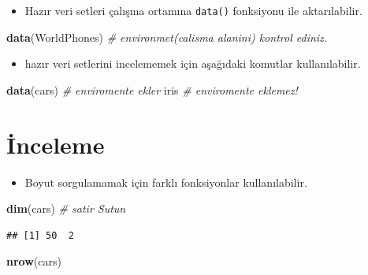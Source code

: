 \documentclass[
  oneside]{book}
\newenvironment{Shaded}{\begin{snugshade}}{\end{snugshade}}
\newcommand{\CommentTok}[1]{\textcolor[rgb]{0.56,0.35,0.01}{\textit{#1}}}
\newcommand{\FunctionTok}[1]{\textcolor[rgb]{0.13,0.29,0.53}{\textbf{#1}}}
\newcommand{\NormalTok}[1]{#1}
\providecommand{\tightlist}{%
  \setlength{\itemsep}{0pt}\setlength{\parskip}{0pt}}
\begin{document}
\begin{itemize}
\tightlist
\item
  Hazır veri setleri çalışma ortamına \texttt{data()} fonksiyonu ile aktarılabilir.
\end{itemize}

\begin{Shaded}
\begin{Highlighting}[]
\FunctionTok{data}\NormalTok{(WorldPhones) }\CommentTok{\# environmet(calisma alanini) kontrol ediniz. }
\end{Highlighting}
\end{Shaded}

\begin{itemize}
\tightlist
\item
  hazır veri setlerini incelememek için aşağıdaki komutlar kullanılabilir.
\end{itemize}

\begin{Shaded}
\begin{Highlighting}[]
\FunctionTok{data}\NormalTok{(cars) }\CommentTok{\# enviromente ekler}
\NormalTok{iris      }\CommentTok{\# enviromente eklemez!}
\end{Highlighting}
\end{Shaded}

\hypertarget{inceleme}{%
\section{İnceleme}\label{inceleme}}

\begin{itemize}
\tightlist
\item
  Boyut sorgulamamak için farklı fonksiyonlar kullanılabilir.
\end{itemize}

\begin{Shaded}
\begin{Highlighting}[]
\FunctionTok{dim}\NormalTok{(cars) }\CommentTok{\# satir Sutun}
\end{Highlighting}
\end{Shaded}

\begin{verbatim}
## [1] 50  2
\end{verbatim}

\begin{Shaded}
\begin{Highlighting}[]
\FunctionTok{nrow}\NormalTok{(cars)}
\end{Highlighting}
\end{Shaded}
\end{document}
